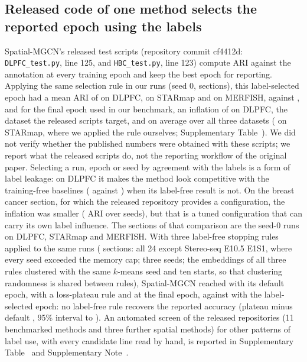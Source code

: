 \documentclass[unnumsec,webpdf,contemporary,large]{oup-authoring-template}
\begin{document}
\subsection{Released code of one method selects the reported epoch using the labels}
Spatial-MGCN's released test scripts (repository commit cf4412d: \texttt{DLPFC\_test.py}, line 125, and
\texttt{HBC\_test.py}, line 123) compute ARI against the annotation at every training epoch and keep the best epoch for reporting. Applying the same selection rule in our runs (seed 0, \mgcnLeakN{} sections),
this label-selected epoch had a mean ARI of \mgcnOracleDlpfc{} on DLPFC, \mgcnOracleStarmap{} on STARmap and \mgcnOracleMerfish{}
on MERFISH, against \mgcnFinalDlpfc, \mgcnFinalStarmap{} and \mgcnFinalMerfish{} for the final epoch used in our benchmark, an
inflation of \mgcnLeakDlpfc{} on DLPFC, the dataset the released scripts target, and \mgcnLeak{} on average over all three datasets (\mgcnLeakStarmap{} on STARmap, where we applied the rule ourselves; Supplementary Table~\STepoch). We did not verify whether the published numbers were obtained with these scripts; we report what the released scripts do, not the
reporting workflow of the original paper. Selecting a run, epoch or seed by
agreement with the labels is a form of label leakage: on DLPFC it makes the method look competitive with the training-free
baselines (\mgcnOracleDlpfc{} against \meanLinDlpfc) when its label-free result is not. On the breast cancer section, for which
the released repository provides a configuration, the inflation was smaller (\mgcnLeakBrca{} ARI over \mgcnLeakBrcaN{} seeds), but that is a tuned configuration that can carry its own label influence. The \mgcnLeakN{} sections of that
comparison are the seed-0 runs on DLPFC, STARmap and MERFISH. With three label-free stopping rules applied to the same runs (\rvAnineNsec{}
sections: all 24 except Stereo-seq E10.5 E1S1, where every seed exceeded the memory cap; three seeds; the embeddings of all three rules clustered
with the same $k$-means seed and ten starts, so that clustering randomness is shared between rules), Spatial-MGCN reached \rvAnineF{} with its default
epoch, \rvAnineP{} with a loss-plateau rule and \rvAnineL{} at the final epoch, against \rvAnineLab{} with the label-selected epoch: no
label-free rule recovers the reported accuracy (plateau minus default \rvAninePF, 95\% interval \rvAninePFLo{} to \rvAninePFHi). An automated screen of the released
repositories (11 benchmarked methods and three further spatial methods) for other patterns of label use, with every candidate line read by hand, is reported in Supplementary
Table~\STaudit{} and Supplementary Note~\SNaudit.
\end{document}
